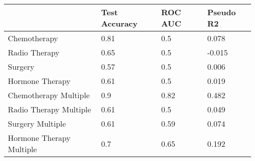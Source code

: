 \begin{tabular}{llll}
\toprule
 & Test Accuracy & ROC AUC & Pseudo R2 \\
\midrule
Chemotherapy & 0.81 & 0.5 & 0.078 \\
Radio Therapy & 0.65 & 0.5 & -0.015 \\
Surgery & 0.57 & 0.5 & 0.006 \\
Hormone Therapy & 0.61 & 0.5 & 0.019 \\
Chemotherapy Multiple & 0.9 & 0.82 & 0.482 \\
Radio Therapy Multiple & 0.61 & 0.5 & 0.049 \\
Surgery Multiple & 0.61 & 0.59 & 0.074 \\
Hormone Therapy Multiple & 0.7 & 0.65 & 0.192 \\
\bottomrule
\end{tabular}
